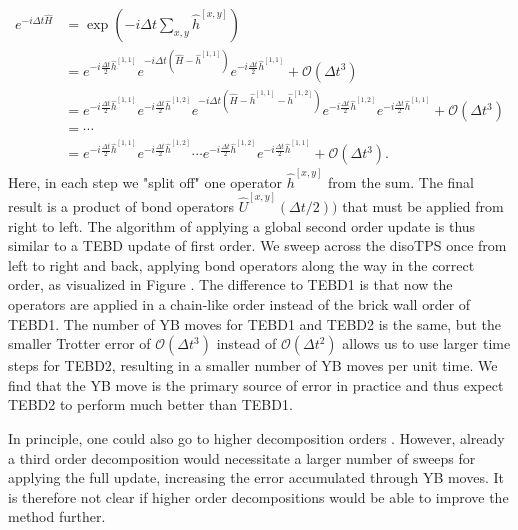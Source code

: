 \begin{equation}
	\begin{split}
		\label{eq:YB_isoTPS_tebd_second_order_suzuki_trotter_decomposition}
		e^{-i\Delta t\hat{H}} &= \exp\left(-i\Delta t\sum_{x,y}\hat{h}^{[x,y]}\right) \\
		&= e^{-i\frac{\Delta t}{2}\hat{h}^{[1, 1]}} e^{-i\Delta t\left(\hat{H}-\hat{h}^{[1,1]}\right)} e^{-i\frac{\Delta t}{2}\hat{h}^{[1, 1]}} + \mathcal{O}(\Delta t^3)\\
		&= e^{-i\frac{\Delta t}{2}\hat{h}^{[1, 1]}} e^{-i\frac{\Delta t}{2}\hat{h}^{[1, 2]}} e^{-i\Delta t\left(\hat{H}-\hat{h}^{[1,1]}-\hat{h}^{[1, 2]}\right)} e^{-i\frac{\Delta t}{2}\hat{h}^{[1, 2]}} e^{-i\frac{\Delta t}{2}\hat{h}^{[1, 1]}} + \mathcal{O}(\Delta t^3)\\
		&=\cdots\\
		&= e^{-i\frac{\Delta t}{2}\hat{h}^{[1, 1]}} e^{-i\frac{\Delta t}{2}\hat{h}^{[1, 2]}} \cdots e^{-i\frac{\Delta t}{2}\hat{h}^{[1, 2]}} e^{-i\frac{\Delta t}{2}\hat{h}^{[1, 1]}} + \mathcal{O}(\Delta t^3).
	\end{split}
\end{equation}
Here, in each step we "split off" one operator $\hat{h}^{[x,y]}$ from the sum. The final result is a product of bond operators $\hat{U}^{[x,y]}(\Delta t/2))$ that must be applied from right to left. The algorithm of applying a global second order update is thus similar to a TEBD update of first order. We sweep across the disoTPS once from left to right and back, applying bond operators along the way in the correct order, as visualized in Figure . The difference to TEBD1 is that now the operators are applied in a chain-like order instead of the brick wall order of TEBD1. The number of YB moves for TEBD1 and TEBD2 is the same, but the smaller Trotter error of $\mathcal{O}(\Delta t^3)$ instead of $\mathcal{O}(\Delta t^2)$ allows us to use larger time steps for TEBD2, resulting in a smaller number of YB moves per unit time. We find that the YB move is the primary source of error in practice and thus expect TEBD2 to perform much better than TEBD1. \par 
In principle, one could also go to higher decomposition orders \cite{cite:finding_exponential_product_formulas_of_higher_orders}. However, already a third order decomposition would necessitate a larger number of sweeps for applying the full update, increasing the error accumulated through YB moves. It is therefore not clear if higher order decompositions would be able to improve the method further.
